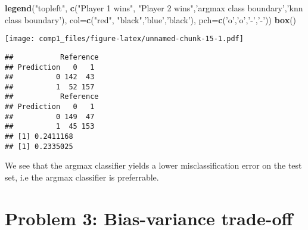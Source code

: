 \documentclass[]{article}
\newenvironment{Shaded}{\begin{snugshade}}{\end{snugshade}}
\newcommand{\KeywordTok}[1]{\textcolor[rgb]{0.13,0.29,0.53}{\textbf{#1}}}
\newcommand{\DataTypeTok}[1]{\textcolor[rgb]{0.13,0.29,0.53}{#1}}
\newcommand{\DecValTok}[1]{\textcolor[rgb]{0.00,0.00,0.81}{#1}}
\newcommand{\StringTok}[1]{\textcolor[rgb]{0.31,0.60,0.02}{#1}}
\newcommand{\OperatorTok}[1]{\textcolor[rgb]{0.81,0.36,0.00}{\textbf{#1}}}
\newcommand{\NormalTok}[1]{#1}
\begin{document}
\begin{Shaded}
\begin{Highlighting}[]
\KeywordTok{legend}\NormalTok{(}\StringTok{"topleft"}\NormalTok{, }\KeywordTok{c}\NormalTok{(}\StringTok{"Player 1 wins"}\NormalTok{, }\StringTok{"Player 2 wins"}\NormalTok{,}\StringTok{'argmax class boundary'}\NormalTok{,}\StringTok{'knn class boundary'}\NormalTok{), }
       \DataTypeTok{col=}\KeywordTok{c}\NormalTok{(}\StringTok{"red"}\NormalTok{, }\StringTok{"black"}\NormalTok{,}\StringTok{'blue'}\NormalTok{,}\StringTok{'black'}\NormalTok{), }\DataTypeTok{pch=}\KeywordTok{c}\NormalTok{(}\StringTok{'o'}\NormalTok{,}\StringTok{'o'}\NormalTok{,}\StringTok{'-'}\NormalTok{,}\StringTok{'-'}\NormalTok{))}
\KeywordTok{box}\NormalTok{()}
\end{Highlighting}
\end{Shaded}

\texttt{[image: comp1\_files/figure-latex/unnamed-chunk-15-1.pdf]}

\begin{Shaded}
\end{Shaded}

\begin{verbatim}
##           Reference
## Prediction   0   1
##          0 142  43
##          1  52 157
##           Reference
## Prediction   0   1
##          0 149  47
##          1  45 153
## [1] 0.2411168
## [1] 0.2335025
\end{verbatim}

We see that the argmax classifier yields a lower misclassification error
on the test set, i.e the argmax classifier is preferrable.

\section{Problem 3: Bias-variance
trade-off}\label{problem-3-bias-variance-trade-off}
\end{document}
